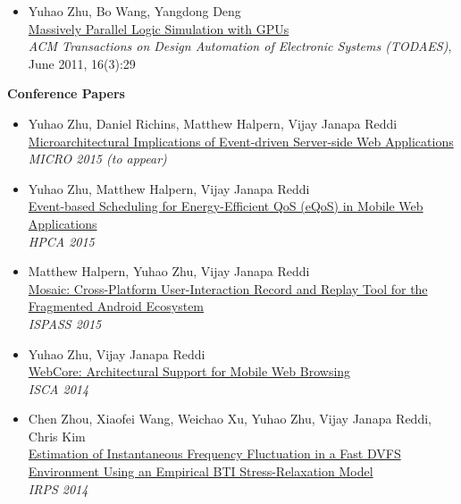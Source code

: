 \documentclass[margin, 9pt]{res} %
\begin{document}
\begin{resume}
\begin{itemize}[leftmargin=*]
	\item Yuhao Zhu, Bo Wang, Yangdong Deng\\
          \href{http://yuhaozhu.com/pubs/todaes11.pdf}{Massively Parallel Logic Simulation with GPUs}\\
          \textit{ACM Transactions on Design Automation of Electronic Systems (TODAES)}, June 2011, 16(3):29
\end{itemize}

\vspace*{7pt}
{\large\textbf{Conference Papers}}

\begin{itemize}[leftmargin=*] \itemsep 0pt
	\item Yuhao Zhu, Daniel Richins, Matthew Halpern, Vijay Janapa Reddi\\
          \href{}{Microarchitectural Implications of Event-driven Server-side Web Applications}\\
          \textit{MICRO 2015 (to appear)}

	\item Yuhao Zhu, Matthew Halpern, Vijay Janapa Reddi\\
          \href{http://yuhaozhu.com/pubs/hpca15.pdf}{Event-based Scheduling for Energy-Efficient QoS (eQoS) in Mobile Web Applications}\\
          \textit{HPCA 2015}

	\item Matthew Halpern, Yuhao Zhu, Vijay Janapa Reddi\\
          \href{http://yuhaozhu.com/pubs/ispass15.pdf}{Mosaic: Cross-Platform User-Interaction Record and Replay Tool for the Fragmented Android Ecosystem}\\
          \textit{ISPASS 2015}

	\item Yuhao Zhu, Vijay Janapa Reddi\\
          \href{http://yuhaozhu.com/pubs/isca14.pdf}{WebCore: Architectural Support for Mobile Web Browsing}\\
          \textit{ISCA 2014}

	\item Chen Zhou, Xiaofei Wang, Weichao Xu, Yuhao Zhu, Vijay Janapa Reddi, Chris Kim\\
          \href{http://yuhaozhu.com/pubs/irps14.pdf}{Estimation of Instantaneous Frequency Fluctuation in a Fast DVFS Environment Using an Empirical BTI Stress-Relaxation Model}\\
          \textit{IRPS 2014}


\end{itemize}
\end{resume}
\end{document}
